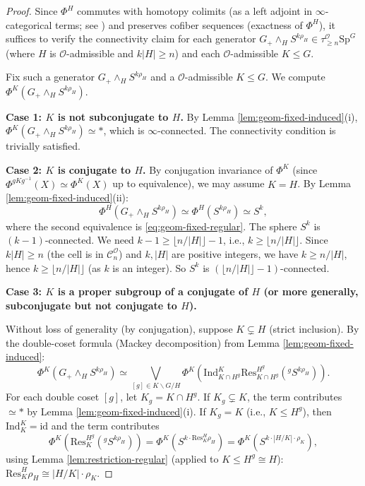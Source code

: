 \documentclass[12pt]{article}
\theoremstyle{definition}
\newcommand{\calO}{\mathcal{O}}
\newcommand{\SpG}{\mathrm{Sp}^G}
\newcommand{\floor}[1]{\lfloor #1 \rfloor}
\begin{document}
\begin{proof}
Since $\Phi^H$ commutes with homotopy colimits (as a left adjoint in $\infty$-categorical
terms; see \cite[Proposition B.209]{HHR2016}) and preserves cofiber sequences (exactness
of $\Phi^H$), it suffices to verify the connectivity claim for each generator
$G_+ \wedge_H S^{k\rho_H} \in \tau_{\geq n}^{\calO}\SpG$ (where $H$ is $\calO$-admissible
and $k|H| \geq n$) and each $\calO$-admissible $K \leq G$.

Fix such a generator $G_+ \wedge_H S^{k\rho_H}$ and a $\calO$-admissible $K \leq G$.
We compute $\Phi^K(G_+ \wedge_H S^{k\rho_H})$.

\textbf{Case 1: $K$ is not subconjugate to $H$.}
By Lemma \ref{lem:geom-fixed-induced}(i), $\Phi^K(G_+ \wedge_H S^{k\rho_H}) \simeq *$,
which is $\infty$-connected. The connectivity condition is trivially satisfied.

\textbf{Case 2: $K$ is conjugate to $H$.}
By conjugation invariance of $\Phi^K$ (since $\Phi^{gKg^{-1}}(X) \simeq \Phi^K(X)$ up to
equivalence), we may assume $K = H$. By Lemma \ref{lem:geom-fixed-induced}(ii):
\[
  \Phi^H(G_+ \wedge_H S^{k\rho_H}) \simeq \Phi^H(S^{k\rho_H}) \simeq S^k,
\]
where the second equivalence is \eqref{eq:geom-fixed-regular}. The sphere $S^k$ is
$(k-1)$-connected. We need $k - 1 \geq \floor{n/|H|} - 1$, i.e., $k \geq \floor{n/|H|}$.
Since $k|H| \geq n$ (the cell is in $\mathcal{C}_n^\calO$) and $k, |H|$ are positive integers,
we have $k \geq n/|H|$, hence $k \geq \floor{n/|H|}$ (as $k$ is an integer). So
$S^k$ is $(\floor{n/|H|}-1)$-connected.

\textbf{Case 3: $K$ is a proper subgroup of a conjugate of $H$ (or more generally,
subconjugate but not conjugate to $H$).}

Without loss of generality (by conjugation), suppose $K \subsetneq H$ (strict inclusion).
By the double-coset formula (Mackey decomposition) from Lemma \ref{lem:geom-fixed-induced}:
\[
  \Phi^K(G_+ \wedge_H S^{k\rho_H})
  \simeq \bigvee_{[g] \in K\backslash G/H} \Phi^K\!\left(\mathrm{Ind}_{K\cap H^g}^K
  \mathrm{Res}_{K \cap H^g}^{H^g} ({}^g S^{k\rho_H})\right).
\]
For each double coset $[g]$, let $K_g = K \cap H^g$. If $K_g \subsetneq K$, the term
contributes $\simeq *$ by Lemma \ref{lem:geom-fixed-induced}(i). If $K_g = K$
(i.e., $K \leq H^g$), then $\mathrm{Ind}_{K}^K = \mathrm{id}$ and the term contributes
\[
  \Phi^K\!\left(\mathrm{Res}_K^{H^g}({}^g S^{k\rho_H})\right)
  = \Phi^K(S^{k \cdot \mathrm{Res}^H_K \rho_H})
  = \Phi^K(S^{k \cdot |H/K| \cdot \rho_K}),
\]
using Lemma \ref{lem:restriction-regular} (applied to $K \leq H^g \cong H$):
$\mathrm{Res}^H_K \rho_H \cong |H/K| \cdot \rho_K$.


\end{proof}
\end{document}
